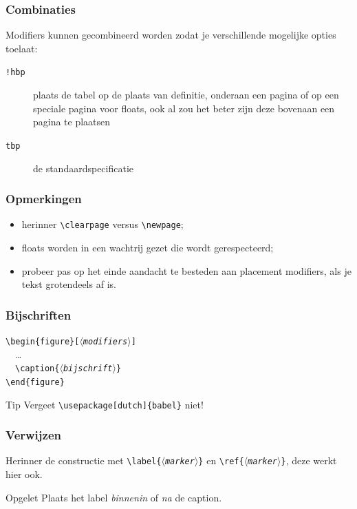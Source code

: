 \begin{frame}
  \frametitle{Combinaties}

  Modifiers kunnen gecombineerd worden zodat je verschillende mogelijke opties toelaat: \\

  \begin{description}
    \item[\texttt{!hbp}] plaats de tabel op de plaats van definitie, onderaan een pagina of op een speciale pagina voor floats, ook al zou het beter zijn deze bovenaan een pagina te plaatsen
    \item[\texttt{tbp}] de standaardspecificatie
  \end{description}
\end{frame}

\begin{frame}[fragile]
  \frametitle{Opmerkingen}

  \begin{itemize}
    \item herinner \verb|\clearpage| versus \verb|\newpage|;
    \item floats worden in een wachtrij gezet die wordt gerespecteerd;
    \item probeer pas op het einde aandacht te besteden aan placement modifiers, als je tekst grotendeels af is.
  \end{itemize}
\end{frame}

\begin{frame}[fragile]
  \frametitle{Bijschriften}

  \texttt{\textbackslash begin\{figure\}[$\langle$\textsl{modifiers}$\rangle$]} \\
  \ \ \ldots \\
  \ \ \texttt{\textbackslash caption\{$\langle$\textsl{bijschrift}$\rangle$\}} \\
  \texttt{\textbackslash end\{figure\}}

  \begin{exampleblock}{Tip}
    Vergeet \verb|\usepackage[dutch]{babel}| niet!
  \end{exampleblock}
\end{frame}

\begin{frame}
  \frametitle{Verwijzen}

  Herinner de constructie met \texttt{\textbackslash label\{$\langle$\textsl{marker}$\rangle$\}} en \texttt{\textbackslash ref\{$\langle$\textsl{marker}$\rangle$\}}, deze werkt hier ook.

  \begin{alertblock}{Opgelet}
    Plaats het label \emph{binnenin} of \emph{na} de caption.
  \end{alertblock}
\end{frame}

